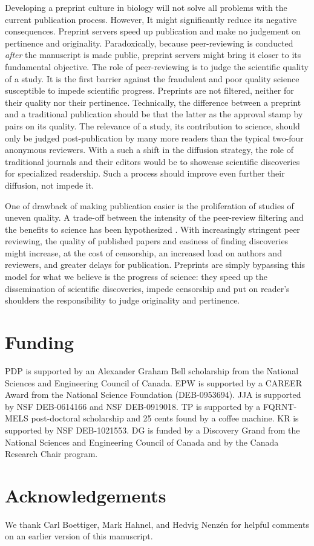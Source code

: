 \documentclass[letterpaper,twocolumn,superscriptaddress,showkeys,longbibliography]{revtex4-1}
\begin{document}
Developing a preprint culture in biology will not solve all problems with the
current publication process. However, It might significantly reduce its negative
consequences. Preprint servers speed up publication and make no judgement on
pertinence and originality. Paradoxically, because peer-reviewing is conducted
\emph{after} the manuscript is made public, preprint servers might bring it
closer to its fundamental objective. The role of peer-reviewing is to judge the
scientific quality of a study. It is the first barrier against the fraudulent
and poor quality science susceptible to impede scientific progress. Preprints
are not filtered, neither for their quality nor their pertinence.  Technically,
the difference between a preprint and a traditional publication should be that
the latter as the approval stamp by pairs on its quality. The relevance of a
study, its contribution to science, should only be judged post-publication by
many more readers than the typical two-four anonymous reviewers. With a such a
shift in the diffusion strategy, the role of traditional journals and their
editors would be to showcase scientific discoveries for specialized readership.
Such a process should improve even further their diffusion, not impede it. 

One of drawback of making publication easier is the proliferation of studies of
uneven quality. A trade-off between the intensity of the peer-review filtering
and the benefits to science has been hypothesized \cite{Aarssen2012}.  With
increasingly stringent peer reviewing, the quality of published papers and
easiness of finding discoveries might increase, at the cost of censorship, an
increased load on authors and reviewers, and greater delays for publication.
Preprints are simply bypassing this model for what we believe is the progress of
science: they speed up the dissemination of scientific discoveries, impede
censorship and put on reader's shoulders the responsibility to judge originality
and pertinence.

\section{Funding}

PDP is supported by an Alexander Graham Bell scholarship from the National
Sciences and Engineering Council of Canada. EPW is supported by a CAREER Award
from the National Science Foundation (DEB-0953694). JJA is supported by NSF
DEB-0614166 and NSF DEB-0919018.  TP is supported by a FQRNT-MELS post-doctoral
scholarship and 25 cents found by a coffee machine.  KR is supported by NSF
DEB-1021553. DG is funded by a Discovery Grand from the National Sciences and
Engineering Council of Canada and by the Canada Research Chair program.

\section{Acknowledgements}

We thank Carl Boettiger, Mark Hahnel, and Hedvig Nenz\'en for helpful comments on an earlier
version of this manuscript.

\newpage

\end{document}
